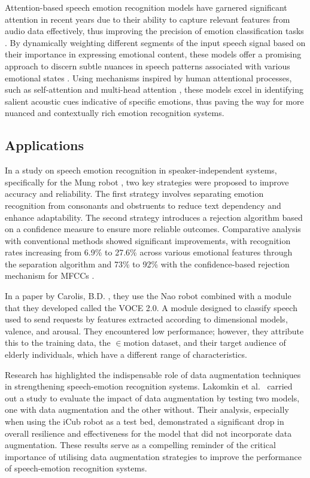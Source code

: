 Attention-based speech emotion recognition models have garnered significant attention in recent years due to their ability to capture relevant features from audio data effectively, thus improving the precision of emotion classification tasks \cite{Peng2020-wv}. By dynamically weighting different segments of the input speech signal \cite{Zhichao2020-bf} based on their importance in expressing emotional content, these models offer a promising approach to discern subtle nuances in speech patterns associated with various emotional states \cite{Nie2022-fo}. Using mechanisms inspired by human attentional processes, such as self-attention and multi-head attention \cite{Rasendrasoa2022-nf}, these models excel in identifying salient acoustic cues indicative of specific emotions, thus paving the way for more nuanced and contextually rich emotion recognition systems.

\subsection{Applications}

In a study on speech emotion recognition in speaker-independent systems, specifically for the Mung robot \cite{Kim2009-in}, two key strategies were proposed to improve accuracy and reliability. The first strategy involves separating emotion recognition from consonants and obstruents to reduce text dependency and enhance adaptability. The second strategy introduces a rejection algorithm based on a confidence measure to ensure more reliable outcomes. Comparative analysis with conventional methods showed significant improvements, with recognition rates increasing from 6.9\% to 27.6\% across various emotional features through the separation algorithm and 73\% to 92\% with the confidence-based rejection mechanism for MFCCs \cite{Kim2018-dh}.

In a paper by Carolis, B.D. \cite{Carolis2016-ig}, they use the Nao robot combined with a module that they developed called the VOCE 2.0. A module designed to classify speech used to send requests by features extracted according to dimensional models, valence, and arousal. They encountered low performance; however, they attribute this to the training data, the \begin{math} \in{} \end{math}motion dataset, and their target audience of elderly individuals, which have a different range of characteristics.

Research has highlighted the indispensable role of data augmentation techniques in strengthening speech-emotion recognition systems. Lakomkin et al.\ \cite{Lakomkin2018-ws} carried out a study to evaluate the impact of data augmentation by testing two models, one with data augmentation and the other without. Their analysis, especially when using the iCub robot as a test bed, demonstrated a significant drop in overall resilience and effectiveness for the model that did not incorporate data augmentation. These results serve as a compelling reminder of the critical importance of utilising data augmentation strategies to improve the performance of speech-emotion recognition systems.

